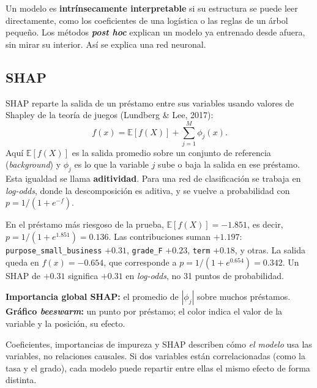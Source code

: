 \documentclass[11pt,a4paper]{article}
\newcommand{\code}[1]{\texttt{#1}}
\begin{document}
Un modelo es \textbf{intrínsecamente interpretable} si su estructura se puede leer directamente, como los coeficientes de una logística o las reglas de un árbol pequeño. Los métodos \textbf{\textit{post hoc}} explican un modelo ya entrenado desde afuera, sin mirar su interior. Así se explica una red neuronal.

\subsection{SHAP}

SHAP reparte la salida de un préstamo entre sus variables usando valores de Shapley de la teoría de juegos (Lundberg \& Lee, 2017):
\begin{equation}
f(x) = \mathbb{E}[f(X)] + \sum_{j=1}^{M}\phi_j(x).
\end{equation}
Aquí $\mathbb{E}[f(X)]$ es la salida promedio sobre un conjunto de referencia (\textit{background}) y $\phi_j$ es lo que la variable $j$ sube o baja la salida en ese préstamo. Esta igualdad se llama \textbf{aditividad}. Para una red de clasificación se trabaja en \textit{log-odds}, donde la descomposición es aditiva, y se vuelve a probabilidad con $p=1/(1+e^{-f})$.

\begin{ejemplo}
En el préstamo más riesgoso de la prueba, $\mathbb{E}[f(X)]=-1.851$, es decir, $p=1/(1+e^{1.851})=0.136$. Las contribuciones suman $+1.197$: \code{purpose\_small\_business} $+0.31$, \code{grade\_F} $+0.23$, \code{term} $+0.18$, y otras. La salida queda en $f(x)=-0.654$, que corresponde a $p=1/(1+e^{0.654})=0.342$.
Un SHAP de $+0.31$ significa $+0.31$ en \textit{log-odds}, no 31 puntos de probabilidad.
\end{ejemplo}

\textbf{Importancia global SHAP:} el promedio de $|\phi_j|$ sobre muchos préstamos. \textbf{Gráfico \textit{beeswarm}:} un punto por préstamo; el color indica el valor de la variable y la posición, su efecto.

\begin{clave}
Coeficientes, importancias de impureza y SHAP describen cómo \emph{el modelo} usa las variables, no relaciones causales. Si dos variables están correlacionadas (como la tasa y el grado), cada modelo puede repartir entre ellas el mismo efecto de forma distinta.
\end{clave}

\end{document}
